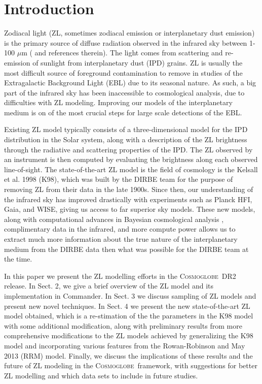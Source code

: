 \documentclass{aa}
\def\Cosmoglobe{\textsc{Cosmoglobe}}
\begin{document}

   \maketitle

\setcounter{tocdepth}{3}
   
\section{Introduction}
Zodiacal light (ZL, sometimes zodiacal emission or interplanetary dust emission) is the primary source of diffuse radiation observed in the infrared sky between 1-100 $\mu$m (\cite{leinert1998} and references therein). The light comes from scattering and re-emission of sunlight from interplanetary dust (IPD) grains. ZL is usually the most difficult source of foreground contamination to remove in studies of the Extragalactic Background Light (EBL) due to its seasonal nature. As such, a big part of the infrared sky has been inaccessible to cosmological analysis, due to difficulties with ZL modeling. Improving our models of the interplanetary medium is on of the most crucial steps for large scale detections of the EBL.

Existing ZL model typically consists of a three-dimensional model for the IPD distribution in the Solar system, along with a description of the ZL brightness through the radiative and scattering properties of the IPD. The ZL observed by an instrument is then computed by evaluating the brightness along each observed line-of-sight. The state-of-the-art ZL model is the field of cosmology is the Kelsall et al. 1998\citep{K98} (K98), which was built by the DIRBE team for the purpose of removing ZL from their data in the late 1900s. Since then, our understanding of the infrared sky has improved drastically with experiments such as Planck HFI, Gaia, and WISE, giving us access to far superior sky models. These new models, along with computational advances in Bayesian cosmological analysis \citep{BP2023, Galloway2023, Watts2023}, complimentary data in the infrared, and more compute power allows us to extract much more information about the true nature of the interplanetary medium from the DIRBE data then what was possible for the DIRBE team at the time.

In this paper we present the ZL modelling efforts in the \Cosmoglobe\ DR2 release. In Sect. 2, we give a brief overview of the ZL model and its implementation in Commander. In Sect. 3 we discuss sampling of ZL models and present new novel techniques. In Sect. 4 we present the new state-of-the-art ZL model obtained, which is a re-stimation of the the parameters in the K98 model with some additional modification, along with preliminary results from more comprehensive modifications to the ZL models achieved by generalizing the K98 model and incorporating various features from the Rowan-Robinson and May 2013 (RRM) model. Finally, we discuss the implications of these results and the future of ZL modeling in the \Cosmoglobe\ framework, with suggestions for better ZL modelling and which data sets to include in future studies.
\end{document}
